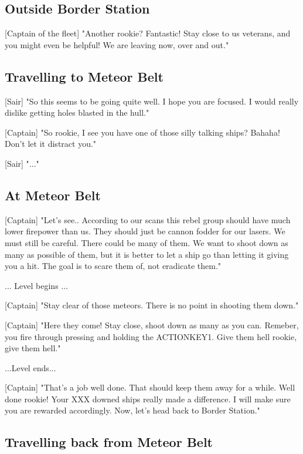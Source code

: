 \documentclass[a4paper,12pt]{article}
\begin{document}
\subsection{Outside Border Station}

[Captain of the fleet] "Another rookie? Fantastic! Stay close to us veterans, and
you might even be helpful! We are leaving now, over and out."

\subsection{Travelling to Meteor Belt}

[Sair] "So this seems to be going quite well. I hope you are focused.
I would really dislike getting holes blasted in the hull."

[Captain] "So rookie, I see you have one of those silly talking ships? 
Bahaha! Don't let it distract you."

[Sair] "..."

\subsection{At Meteor Belt}

[Captain] "Let's see.. According to our scans this rebel group should have much lower firepower than
us. They should just be cannon fodder for our lasers. We must still be careful. There could be many of them.
We want to shoot down as many as possible of them, but it is better to let a ship go than letting it giving
you a hit. The goal is to scare them of, not eradicate them."

... Level begins ...

[Captain] "Stay clear of those meteors. There is no point in shooting them down."

[Captain] "Here they come! Stay close, shoot down as many as you can. Remeber,
you fire through pressing and holding the ACTIONKEY1. Give them hell rookie, give them hell."

...Level ends...

[Captain] "That's a job well done. That should keep them away for a while. Well done rookie! 
Your XXX downed ships really made a difference.
I will make sure you are rewarded accordingly. Now, let's head back to Border Station."

\subsection{Travelling back from Meteor Belt}
\end{document}
